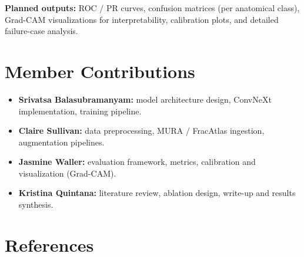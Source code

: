 \documentclass[conference]{IEEEtran}
\begin{document}
\textbf{Planned outputs:}
ROC / PR curves, confusion matrices (per anatomical class), Grad-CAM visualizations for interpretability, calibration plots, and detailed failure-case analysis.

\section{Member Contributions}
\begin{itemize}
  \item \textbf{Srivatsa Balasubramanyam:} model architecture design, ConvNeXt implementation, training pipeline.
  \item \textbf{Claire Sullivan:} data preprocessing, MURA / FracAtlas ingestion, augmentation pipelines.
  \item \textbf{Jasmine Waller:} evaluation framework, metrics, calibration and visualization (Grad-CAM).
  \item \textbf{Kristina Quintana:} literature review, ablation design, write-up and results synthesis.
\end{itemize}

\section{References}



\end{document}
